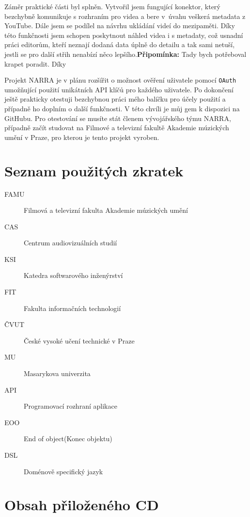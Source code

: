 \documentclass[thesis=B,czech]{FITthesis}[2012/06/26]
\newcommand{\note}[1]{{\color{red}\textbf{Připomínka:} #1}}
\begin{document}
\begin{conclusion}
	\par Záměr praktické části byl splněn. Vytvořil jsem fungující konektor, který bezchybně komunikuje s rozhraním pro videa a bere v~úvahu veškerá metadata z YouTube. Dále jsem se podílel na návrhu ukládání videí do mezipaměti. Díky této funkčnosti jsem schopen poskytnout náhled videa i s metadaty, což usnadní práci editorům, kteří neznají dodaná data úplně do detailu a tak sami netuší, jestli se pro další střih nenabízí něco lepšího.\note{Tady bych potřeboval krapet poradit. Díky}
	\par Projekt NARRA je v plánu rozšířit o možnost ověření uživatele pomocí \texttt{OAuth} umožňující použití unikátních API klíčů pro každého uživatele. Po dokončení ještě prakticky otestuji bezchybnou práci mého balíčku pro účely použití a případně ho doplním o další funkčnosti. V této chvíli je můj gem k dispozici na GitHubu\cite{myself}. Pro otestování se musíte stát členem vývojářského týmu NARRA, případně začít studovat na Filmové a televizní fakultě Akademie múzických umění v Praze, pro kterou je tento projekt vyroben.
\end{conclusion}




\appendix

\chapter{Seznam použitých zkratek}
\begin{description}
	\item[FAMU] Filmová a televizní fakulta Akademie múzických umění
	\item[CAS] Centrum audiovizuálních studií
	\item[KSI] Katedra softwarového inženýrství
	\item[FIT] Fakulta informačních technologií
	\item[ČVUT] České vysoké učení technické v Praze
	\item[MU] Masarykova univerzita
	\item[API] Programovací rozhraní aplikace
	\item[EOO] End of object(Konec objektu)
	\item[DSL] Doménově specifický jazyk
\end{description}


\chapter{Obsah přiloženého CD}

\begin{figure}
\end{figure}
\end{document}

